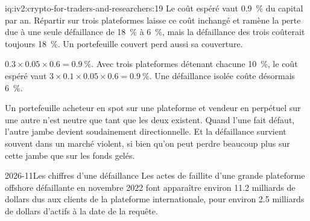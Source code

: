 \begin{solution}{iq:iv2:crypto-for-traders-and-researchers:19}
Le coût espéré vaut 0.9~\% du capital par an. Répartir sur trois plateformes laisse ce coût inchangé et ramène la perte due à une seule défaillance de 18~\% à 6~\%, mais la défaillance des trois coûterait toujours 18~\%. Un portefeuille couvert perd aussi sa couverture.

$0.3 \times 0.05 \times 0.6 = 0.9~\%$. Avec trois plateformes détenant chacune 10~\%, le coût espéré vaut $3 \times 0.1 \times 0.05 \times 0.6 = 0.9~\%$. Une défaillance isolée coûte désormais 6~\%.

Un portefeuille acheteur en spot sur une plateforme et vendeur en perpétuel sur une autre n'est neutre que tant que les deux existent. Quand l'une fait défaut, l'autre jambe devient soudainement directionnelle. Et la défaillance survient souvent dans un marché violent, si bien qu'on peut perdre beaucoup plus sur cette jambe que sur les fonds gelés.

\begin{dated}{2026-11}{Les chiffres d'une défaillance}\label{dat:iv2:crypto-for-traders-and-researchers:fail}
Les actes de faillite d'une grande plateforme offshore défaillante en novembre 2022 font apparaître environ 11.2 milliards de dollars dus aux clients de la plateforme internationale, pour environ 2.5 milliards de dollars d'actifs à la date de la requête.
\end{dated}

\end{solution}

